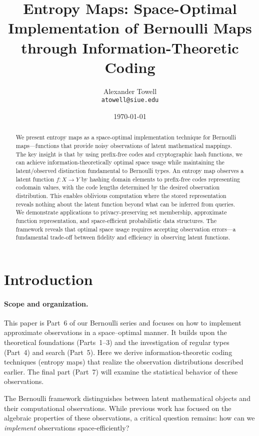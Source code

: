 \documentclass[11pt,final,hidelinks]{article}
\title{Entropy Maps: Space-Optimal Implementation of Bernoulli Maps through Information-Theoretic Coding}
\author{
    Alexander Towell\\
    \texttt{atowell@siue.edu}
}
\date{\today}
\begin{document}
\maketitle
\NotationSection

\begin{abstract}
We present entropy maps as a space-optimal implementation technique for Bernoulli maps—functions that provide noisy observations of latent mathematical mappings. The key insight is that by using prefix-free codes and cryptographic hash functions, we can achieve information-theoretically optimal space usage while maintaining the latent/observed distinction fundamental to Bernoulli types. An entropy map observes a latent function $f: X \to Y$ by hashing domain elements to prefix-free codes representing codomain values, with the code lengths determined by the desired observation distribution. This enables oblivious computation where the stored representation reveals nothing about the latent function beyond what can be inferred from queries. We demonstrate applications to privacy-preserving set membership, approximate function representation, and space-efficient probabilistic data structures. The framework reveals that optimal space usage requires accepting observation errors—a fundamental trade-off between fidelity and efficiency in observing latent functions.
\end{abstract}

\section{Introduction}

\paragraph{Scope and organization.}  This paper is Part~6 of our Bernoulli series and focuses on how to implement approximate observations in a space–optimal manner.  It builds upon the theoretical foundations (Parts~1--3) and the investigation of regular types (Part~4) and search (Part~5).  Here we derive information-theoretic coding techniques (entropy maps) that realize the observation distributions described earlier.  The final part (Part~7) will examine the statistical behavior of these observations.

The Bernoulli framework distinguishes between latent mathematical objects and their computational observations. While previous work has focused on the algebraic properties of these observations, a critical question remains: how can we \emph{implement} observations space-efficiently?
\end{document}
